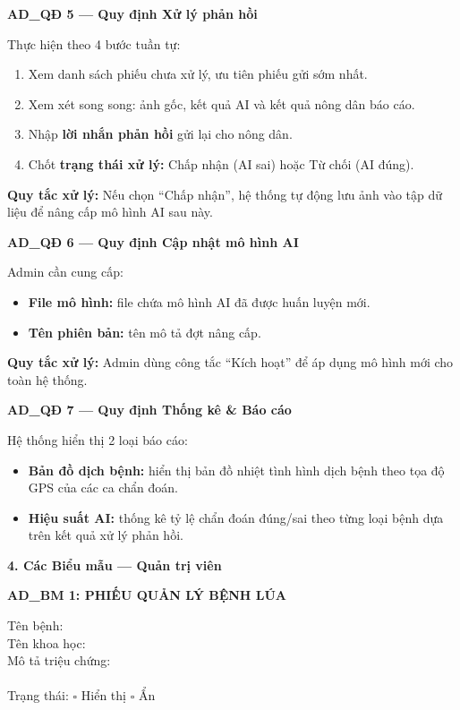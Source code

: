 \documentclass[12pt,a4paper]{article}
\begin{document}
\vspace{0.3cm}
\noindent\textbf{AD\_QĐ 5 --- Quy định Xử lý phản hồi}

Thực hiện theo 4 bước tuần tự:
\begin{enumerate}
    \item Xem danh sách phiếu chưa xử lý, ưu tiên phiếu gửi sớm nhất.
    \item Xem xét song song: ảnh gốc, kết quả AI và kết quả nông dân báo cáo.
    \item Nhập \textbf{lời nhắn phản hồi} gửi lại cho nông dân.
    \item Chốt \textbf{trạng thái xử lý:} Chấp nhận (AI sai) hoặc Từ chối (AI đúng).
\end{enumerate}
\textbf{Quy tắc xử lý:} Nếu chọn ``Chấp nhận'', hệ thống tự động lưu ảnh vào tập dữ liệu để nâng cấp mô hình AI sau này.

\vspace{0.3cm}
\noindent\textbf{AD\_QĐ 6 --- Quy định Cập nhật mô hình AI}

Admin cần cung cấp:
\begin{itemize}
    \item \textbf{File mô hình:} file chứa mô hình AI đã được huấn luyện mới.
    \item \textbf{Tên phiên bản:} tên mô tả đợt nâng cấp.
\end{itemize}
\textbf{Quy tắc xử lý:} Admin dùng công tắc ``Kích hoạt'' để áp dụng mô hình mới cho toàn hệ thống.

\vspace{0.3cm}
\noindent\textbf{AD\_QĐ 7 --- Quy định Thống kê \& Báo cáo}

Hệ thống hiển thị 2 loại báo cáo:
\begin{itemize}
    \item \textbf{Bản đồ dịch bệnh:} hiển thị bản đồ nhiệt tình hình dịch bệnh theo tọa độ GPS của các ca chẩn đoán.
    \item \textbf{Hiệu suất AI:} thống kê tỷ lệ chẩn đoán đúng/sai theo từng loại bệnh dựa trên kết quả xử lý phản hồi.
\end{itemize}

\vspace{0.3cm}
\textbf{4. Các Biểu mẫu --- Quản trị viên}

\vspace{0.3cm}
\noindent\textbf{AD\_BM 1: PHIẾU QUẢN LÝ BỆNH LÚA}

\noindent Tên bệnh: \dotfill \\
Tên khoa học: \dotfill \\
Mô tả triệu chứng: \dotfill \\
\dotfill \\
Trạng thái: $\square$ Hiển thị \quad $\square$ Ẩn
\end{document}
